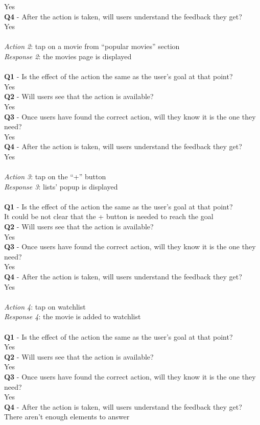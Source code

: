 \documentclass[12pt, a4paper]{article}
\numberwithin{figure}{section}
\newcommand\tab[1][1cm]{\hspace*{#1}}
\begin{document}
\tab Yes\\
\textbf{Q4} - After the action is taken, will users understand the feedback they get?\\
\tab Yes\\\\
\textit{Action 2}: tap on a movie from “popular movies” section\\
\textit{Response 2}: the movies page is displayed\\\\
\textbf{Q1} - Is the effect of the action the same as the user’s goal at that point?\\
\tab Yes\\
\textbf{Q2} - Will users see that the action is available?\\
\tab Yes\\
\textbf{Q3} - Once users have found the correct action, will they know it is the one they need?\\
\tab Yes\\
\textbf{Q4} - After the action is taken, will users understand the feedback they get?\\
\tab Yes\\\\
\textit{Action 3}: tap on the “+” button\\
\textit{Response 3}: lists’ popup is displayed\\\\
\textbf{Q1} - Is the effect of the action the same as the user’s goal at that point?\\
\tab It could be not clear that the + button is needed to reach the goal\\
\textbf{Q2} - Will users see that the action is available?\\
\tab Yes\\
\textbf{Q3} - Once users have found the correct action, will they know it is the one they need?\\
\tab Yes\\
\textbf{Q4} - After the action is taken, will users understand the feedback they get?\\
\tab Yes\\\\
\textit{Action 4}: tap on watchlist\\
\textit{Response 4}: the movie is added to watchlist\\\\
\textbf{Q1} - Is the effect of the action the same as the user’s goal at that point?\\
\tab Yes\\
\textbf{Q2} - Will users see that the action is available?\\
\tab Yes\\
\textbf{Q3} - Once users have found the correct action, will they know it is the one they need?\\
\tab Yes\\
\textbf{Q4} - After the action is taken, will users understand the feedback they get?\\
\tab There aren't enough elements to answer\\\\
\end{document}
